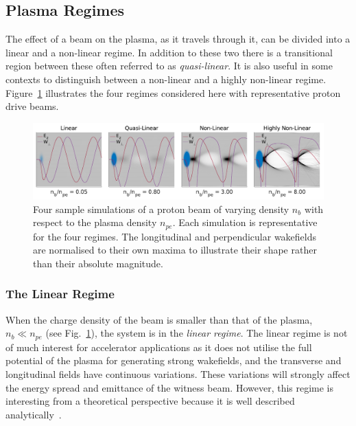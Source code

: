 \subsection{Plasma Regimes}
\label{Int:BPI:Reg}

The effect of a beam on the plasma, as it travels through it, can be divided into a linear and a non-linear regime. In addition to these two there is a transitional region between these often referred to as \textit{quasi-linear}. It is also useful in some contexts to distinguish between a non-linear and a highly non-linear regime. Figure~\ref{Fig:BPI:Regime} illustrates the four regimes considered here with representative proton drive beams.

\begin{figure}[hbt]
    \centering
    \includegraphics[width=1.0\linewidth,trim={0mm 0mm 0mm 0mm},clip]{figures/Regimes}
    \caption{\label{Fig:BPI:Regime} Four sample simulations of a proton beam of varying density $n_{b}$ with respect to the plasma density $n_{pe}$. Each simulation is representative for the four regimes. The longitudinal and perpendicular wakefields are normalised to their own maxima to illustrate their shape rather than their absolute magnitude.}
\end{figure}

\subsubsection{The Linear Regime}
\label{Int:BPI:Lin}

When the charge density of the beam is smaller than that of the plasma, $n_{b} \ll n_{pe}$ (see Fig.~\ref{Fig:BPI:Regime}), the system is in the \textit{linear regime}. The linear regime is not of much interest for accelerator applications as it does not utilise the full potential of the plasma for generating strong wakefields, and the transverse and longitudinal fields have continuous variations. These variations will strongly affect the energy spread and emittance of the witness beam. However, this regime is interesting from a theoretical perspective because it is well described analytically~\cite{muggli:2017}.

